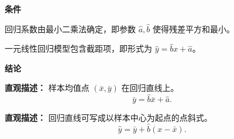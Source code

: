 \begin{statementbox}
	\textbf{\textcolor{CStatement}{条件}}
	\begin{description}[style=nextline, leftmargin=2.8em, labelsep=0.5em, itemsep=0.35em]
		\item[\textbf{\textcolor{CStatement}{条件1（最小二乘估计）：}}]
			回归系数由最小二乘法确定，即参数 $\hat{a},\hat{b}$ 使得残差平方和最小。
		\item[\textbf{\textcolor{CStatement}{条件2（含截距项）：}}]
			一元线性回归模型包含截距项，即形式为 $\hat{y} = \hat{b}x + \hat{a}$。
	\end{description}

	\medskip
	\textbf{\textcolor{CStatement}{结论}}
	\begin{description}[style=nextline, leftmargin=2.8em, labelsep=0.5em, itemsep=0.45em]
		\item[\textbf{\textcolor{CStatement}{结论一（过样本中心）：}}]
			\textbf{\textcolor{CStatement}{直观描述：}}
			样本均值点 $(\bar{x},\bar{y})$ 在回归直线上。
			\[
				\bar{y} = \hat{b}\bar{x} + \hat{a}.
			\]
		\item[\textbf{\textcolor{CStatement}{推广结论（点斜式方程）：}}]
			\textbf{\textcolor{CStatement}{直观描述：}}
			回归直线可写成以样本中心为起点的点斜式。
			\[
				\hat{y} = \bar{y} + \hat{b}(x - \bar{x}).
			\]
	\end{description}

\end{statementbox}
